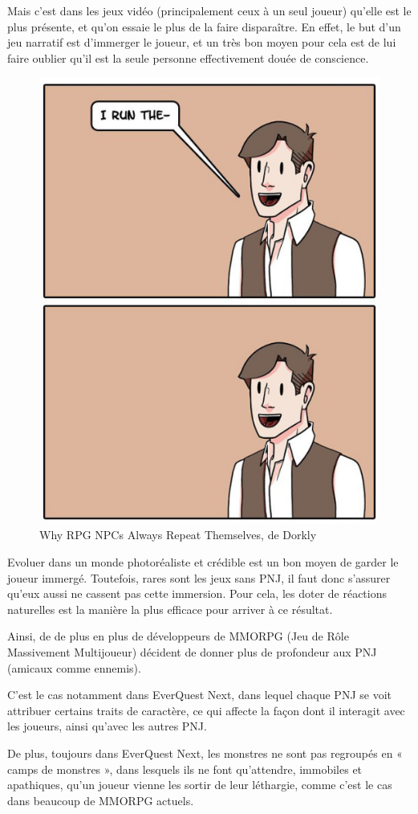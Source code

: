 \documentclass[a4paper, 12pt]{article} %
\begin{document}
Mais c'est dans les jeux vidéo (principalement ceux à un seul joueur) qu'elle est le plus présente, et qu’on essaie le plus de la faire disparaître. En effet, le but d’un jeu narratif est d’immerger le joueur, et un très bon moyen pour cela est de lui faire oublier qu’il est la seule personne effectivement douée de conscience.

\begin{figure}[!h]%
	\begin{center} 
		\includegraphics[width=0.60\columnwidth]{images/repeat3.png}%
		\caption{Why RPG NPCs Always Repeat Themselves, de Dorkly}%
	\end{center}
\end{figure}

Evoluer dans un monde photoréaliste et crédible est un bon moyen de garder le joueur immergé. Toutefois, rares sont les jeux sans PNJ, il faut donc s’assurer qu’eux aussi ne cassent pas cette immersion. Pour cela, les doter de réactions naturelles est la manière la plus efficace pour arriver à ce résultat.

Ainsi, de de plus en plus de développeurs de MMORPG (Jeu de Rôle Massivement Multijoueur) décident de donner plus de profondeur aux PNJ (amicaux comme ennemis).

C’est le cas notamment dans EverQuest Next, dans lequel chaque PNJ se voit attribuer certains traits de caractère, ce qui affecte la façon dont il interagit avec les joueurs, ainsi qu’avec les autres PNJ. 

De plus, toujours dans EverQuest Next, les monstres ne sont pas regroupés en « camps de monstres », dans lesquels ils ne font qu’attendre, immobiles et apathiques, qu’un joueur vienne les sortir de leur léthargie, comme c’est le cas dans beaucoup de MMORPG actuels. 
\end{document}
